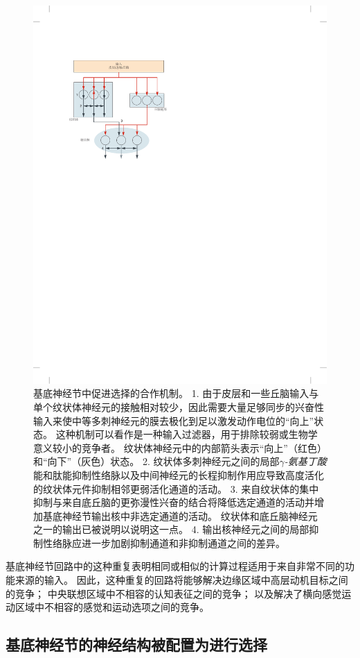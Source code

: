 \begin{figure}[htbp]
	\centering
	\includegraphics[width=0.65\linewidth]{chap38/fig_38_7}
	\caption{基底神经节中促进选择的合作机制。
		1. 由于皮层和一些丘脑输入与单个纹状体神经元的接触相对较少，因此需要大量足够同步的兴奋性输入来使中等多刺神经元的膜去极化到足以激发动作电位的“向上”状态。
		这种机制可以看作是一种输入过滤器，用于排除较弱或生物学意义较小的竞争者。
		纹状体神经元中的内部箭头表示“向上”（红色）和“向下”（灰色）状态。
		2. 纹状体多刺神经元之间的局部\textit{$\gamma$-氨基丁酸}能和肽能抑制性络脉以及中间神经元的长程抑制作用应导致高度活化的纹状体元件抑制相邻更弱活化通道的活动。
		3. 来自纹状体的集中抑制与来自底丘脑的更弥漫性兴奋的结合将降低选定通道的活动并增加基底神经节输出核中非选定通道的活动。
		纹状体和底丘脑神经元之一的输出已被说明以说明这一点。
		4. 输出核神经元之间的局部抑制性络脉应进一步加剧抑制通道和非抑制通道之间的差异。}
	\label{fig:38_7}
\end{figure}


基底神经节回路中的这种重复表明相同或相似的计算过程适用于来自非常不同的功能来源的输入。
因此，这种重复的回路将能够解决边缘区域中高层动机目标之间的竞争；
中央联想区域中不相容的认知表征之间的竞争；
以及解决了横向感觉运动区域中不相容的感觉和运动选项之间的竞争。



\subsection{基底神经节的神经结构被配置为进行选择}

